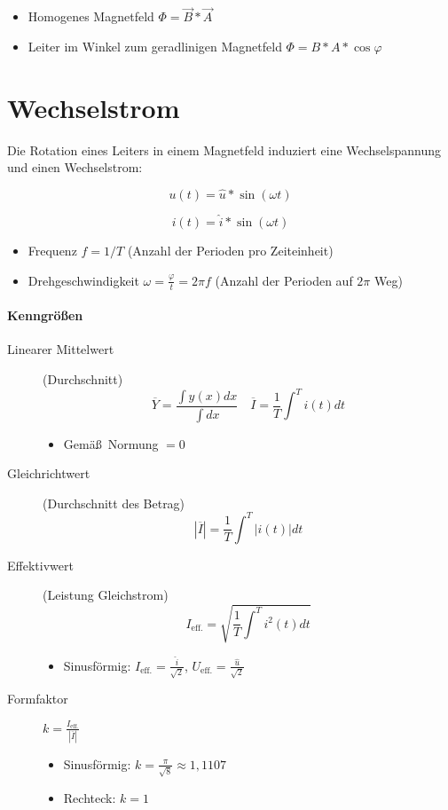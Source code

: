 \begin{itemize}
  \item Homogenes Magnetfeld $\Phi = \vec{B} * \vec{A}$
  \item Leiter im Winkel zum geradlinigen Magnetfeld $\Phi = B * A * \cos \varphi$
\end{itemize}

\section{Wechselstrom}

Die Rotation eines Leiters in einem Magnetfeld induziert eine Wechselspannung und einen Wechselstrom:

$$u(t) = \hat{u} * \sin(\omega t)$$

$$i(t) = \hat{i} * \sin(\omega t)$$

\begin{itemize}
  \item Frequenz $f = 1/T$ (Anzahl der Perioden pro Zeiteinheit)
  \item Drehgeschwindigkeit $\omega = \frac{\varphi}{t} = 2 \pi f$ (Anzahl der Perioden auf $2\pi$ Weg)
\end{itemize}

\paragraph{Kenngrö\ss en}

\begin{description}
  \item[Linearer Mittelwert] (Durchschnitt)
    $$\overline{Y} = \frac{\int y(x)dx}{\int dx} \quad \overline{I} = \frac{1}{T} \int^T i(t) dt$$

    \begin{itemize}
      \item Gemä\ss~Normung $= 0$
    \end{itemize}

  \item[Gleichrichtwert] (Durchschnitt des Betrag)
    $$|\overline{I}| = \frac{1}{T} \int^T |i(t)| dt$$

  \item[Effektivwert] (Leistung Gleichstrom)
    $$I_\text{eff.} = \sqrt{\frac{1}{T} \int^T i^2(t) dt} $$

    \begin{itemize}
      \item Sinusförmig: $I_\text{eff.} = \frac{\hat{i}}{\sqrt{2}}$, $U_\text{eff.} = \frac{\hat{u}}{\sqrt{2}}$
    \end{itemize}

  \item[Formfaktor] $k = \frac{I_\text{eff.}}{|\overline{I}|}$

    \begin{itemize}
      \item Sinusförmig: $k = \frac{\pi}{\sqrt{8}} \approx 1,1107$
      \item Rechteck: $k = 1$
    \end{itemize}
\end{description}

